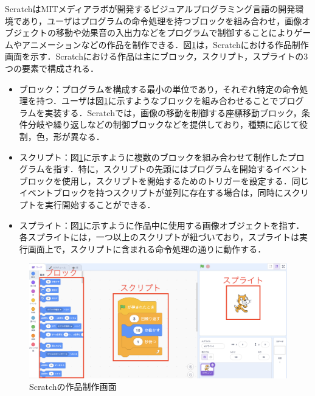 \documentclass[T,J]{fose} %
\begin{document}
ScratchはMITメディアラボが開発するビジュアルプログラミング言語の開発環境であり，ユーザはプログラムの命令処理を持つブロックを組み合わせ，画像オブジェクトの移動や効果音の入出力などをプログラムで制御することによりゲームやアニメーションなどの作品を制作できる．図\ref{fig:Scratch-description}は，Scratchにおける作品制作画面を示す．Scratchにおける作品は主にブロック，スクリプト，スプライトの3つの要素で構成される．
\begin{itemize}
\item ブロック：プログラムを構成する最小の単位であり，それぞれ特定の命令処理を持つ．ユーザは図\ref{fig:Scratch-description}に示すようなブロックを組み合わせることでプログラムを実装する．Scratchでは，画像の移動を制御する座標移動ブロック，条件分岐や繰り返しなどの制御ブロックなどを提供しており，種類に応じて役割，色，形が異なる．
\item スクリプト：図\ref{fig:Scratch-description}に示すように複数のブロックを組み合わせて制作したプログラムを指す．特に，スクリプトの先頭にはプログラムを開始するイベントブロックを使用し，スクリプトを開始するためのトリガーを設定する．同じイベントブロックを持つスクリプトが並列に存在する場合は，同時にスクリプトを実行開始することができる．
\item スプライト：図\ref{fig:Scratch-description}に示すように作品中に使用する画像オブジェクトを指す．各スプライトには，一つ以上のスクリプトが紐づいており，スプライトは実行画面上で，スクリプトに含まれる命令処理の通りに動作する．
\end{itemize}
\begin{figure}[t]
	\centering
	\includegraphics[width=1.0\linewidth]{Okamoto_fig/project.pdf}
	\caption{Scratchの作品制作画面}
	\label{fig:Scratch-description}
\end{figure}
\end{document}
